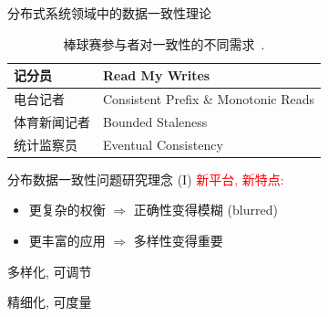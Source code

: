 \begin{frame}{分布式系统领域中的数据一致性理论}
  \vspace{0.50cm}


  \begin{table}
	\centering
	\begin{tabular}{l||l}
	  \hline
	  记分员 		& Read My Writes 						\\ \hline
	  电台记者 		& Consistent Prefix \& Monotonic Reads 	\\ \hline
	  体育新闻记者	& Bounded Staleness 					\\ \hline
	  统计监察员	& Eventual Consistency 					\\ \hline
	\end{tabular}
	\caption{棒球赛参与者对一致性的不同需求~.}
  \end{table}
\end{frame}
% 	  
\begin{frame}{分布数据一致性问题研究理念 (I)}
  \textcolor{red}{新平台, 新特点:} 

  \begin{itemize}
	\item<2-> 更复杂的权衡 $\Longrightarrow$ 正确性变得模糊 {\small (blurred)}
	\item<3-> 更丰富的应用 $\Longrightarrow$ 多样性变得重要
  \end{itemize}

  \vspace{1.00cm}

  \begin{description}
	\centering
	\item<5>[理念一:] 多样化, 可调节
	\item<5>[理念二:] 精细化, 可度量
  \end{description}
\end{frame}
